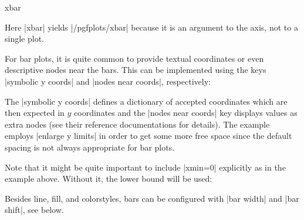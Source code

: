 {\begin{plottype}{xbar}
\begin{codeexample}[]
\end{codeexample}
Here |xbar| yields |/pgfplots/xbar| because it is an argument to the axis, not to a single plot.

	For bar plots, it is quite common to provide textual coordinates or even descriptive nodes near the bars.
	This can be implemented using the keys |symbolic y coords| and |nodes near coords|, respectively:
\begin{codeexample}[]
\end{codeexample}
	The |symbolic y coords| defines a dictionary of accepted coordinates which are then expected in $y$ coordinates and the |nodes near coords| key displays values as extra nodes (see their reference documentations for details). The example employs |enlarge y limits| in order to get some more free space since the default spacing is not always appropriate for bar plots.

	Note that it might be quite important to include |xmin=0| explicitly as in the example above. Without it, the lower bound will be used:
\begin{codeexample}[]
\end{codeexample}

	Besides line, fill, and colorstyles, bars can be configured with |bar width| and |bar shift|, see below.
\end{plottype}

}
